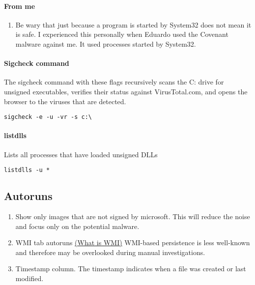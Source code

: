 \documentclass{article}
\begin{document}
\paragraph{From me}
\begin{enumerate}
    \item Be wary that just because a program is started by System32 does not mean it is safe. 
    I experienced this personally when Eduardo used the Covenant malware against me. 
    It used processes started by System32.
\end{enumerate}    

\paragraph{Sigcheck command}
The sigcheck command with these flags recursively scans the C: 
drive for unsigned executables, verifies their status against VirusTotal.com,
 and opens the browser to the viruses that are detected.
\begin{lstlisting}[breaklines=true, columns=fullflexible]
        sigcheck -e -u -vr -s c:\       
\end{lstlisting}

\paragraph{listdlls}
Lists all processes that have loaded unsigned DLLs
\begin{lstlisting}[breaklines=true, columns=fullflexible]
        listdlls -u *       
\end{lstlisting}

\subsection{Autoruns}

\begin{enumerate}
        \item Show only images that are not signed by microsoft. This will reduce the noise and focus only on the potential malware.
        \item WMI tab autoruns \href{https://medium.com/threatpunter/detecting-removing-wmi-persistence-60ccbb7dff96}{(What is WMI)} WMI-based persistence is less well-known and therefore may be overlooked during manual investigations. 
        \item Timestamp column. The timestamp indicates when a file was created or last modified.
\end{enumerate}
\end{document}
